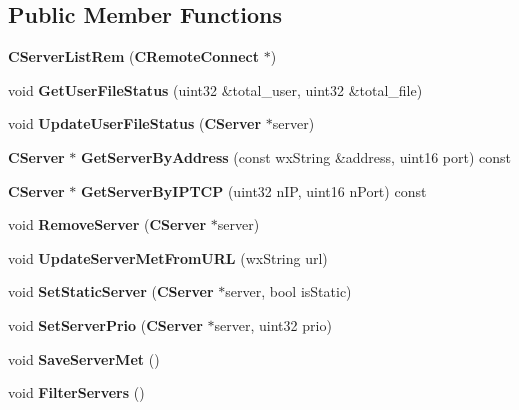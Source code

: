 \subsection*{Public Member Functions}
\begin{DoxyCompactItemize}
\item 
{\bfseries CServerListRem} ({\bf CRemoteConnect} $\ast$)\label{classCServerListRem_a32855d85378dfe087edf3d06f996f18c}

\item 
void {\bfseries GetUserFileStatus} (uint32 \&total\_\-user, uint32 \&total\_\-file)\label{classCServerListRem_a492e8586772ef0b99a18f15dc338b0a6}

\item 
void {\bfseries UpdateUserFileStatus} ({\bf CServer} $\ast$server)\label{classCServerListRem_a5a9753f12c444fd261d13c21dfe88dc4}

\item 
{\bf CServer} $\ast$ {\bfseries GetServerByAddress} (const wxString \&address, uint16 port) const \label{classCServerListRem_a4978e2977d062e3c6614b3aca8c2ad49}

\item 
{\bf CServer} $\ast$ {\bfseries GetServerByIPTCP} (uint32 nIP, uint16 nPort) const \label{classCServerListRem_ad67ceb12a3ce71ef86e3239c463301ef}

\item 
void {\bfseries RemoveServer} ({\bf CServer} $\ast$server)\label{classCServerListRem_a723313f67431021c77fe13878dda71a7}

\item 
void {\bfseries UpdateServerMetFromURL} (wxString url)\label{classCServerListRem_a60ea68ca07964216f03af9a3220c1c95}

\item 
void {\bfseries SetStaticServer} ({\bf CServer} $\ast$server, bool isStatic)\label{classCServerListRem_aa2dba2a894e20633480fabc951a9d2e2}

\item 
void {\bfseries SetServerPrio} ({\bf CServer} $\ast$server, uint32 prio)\label{classCServerListRem_a2fd53cf9384236133d8134546d68cd81}

\item 
void {\bfseries SaveServerMet} ()\label{classCServerListRem_aaf55b2a87faf7380e7f959c9246dee2a}

\item 
void {\bfseries FilterServers} ()\label{classCServerListRem_ae13258cdea87c30c2ce58c3a78ff1c65}


\end{DoxyCompactItemize}
